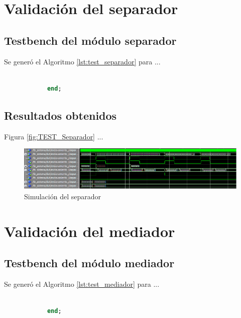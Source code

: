 \section{Validación del separador}

	\subsection{Testbench del módulo separador}
			
		Se generó el Algoritmo \ref{lst:test_separador} para ...
		
			
		\begin{lstlisting}[language = vhdl,caption=Testbench del módulo separador,label={lst:test_separador}] 
				
			end;
		\end{lstlisting}
			
	\subsection{Resultados obtenidos}
				
		Figura \ref{fig:TEST_Separador} ...
		
		\begin{figure}[h]
		\centering
		\includegraphics[scale=0.6]{./Figures/Test/Separador}
			\caption{Simulación del separador}
			\label{fig:Test_Separador}
		\end{figure}
		
\section{Validación del mediador}

	\subsection{Testbench del módulo mediador}
			
		Se generó el Algoritmo \ref{lst:test_mediador} para ...
		
			
		\begin{lstlisting}[language = vhdl,caption=Testbench del módulo mediador,label={lst:test_mediador}] 
				
			end;
		\end{lstlisting}
			
